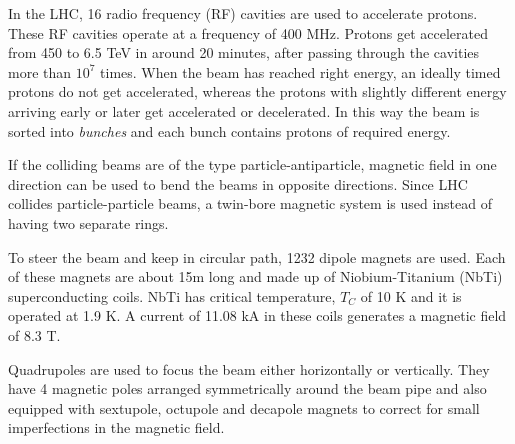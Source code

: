 In the LHC, 16 radio frequency (RF) cavities are used to accelerate protons. These RF cavities operate at a frequency of 400 MHz. Protons 
get accelerated from 450 \gev to 6.5 TeV in around 20 minutes, after passing through the cavities more than $10^7$ times. When the
beam has reached right energy, an ideally timed protons do not get accelerated, whereas the protons with slightly different energy
arriving early or later get accelerated or decelerated. In this way the beam is sorted into \textit{bunches} and each bunch contains
protons of required energy.

If the colliding beams are of the type particle-antiparticle, magnetic field in one direction can be used to bend the beams in opposite 
directions. Since LHC collides particle-particle beams, a twin-bore magnetic system is used instead of having two separate rings.

To steer the beam and keep in circular path, 1232 dipole magnets are used. Each of these magnets are about 15m long and made up of 
Niobium-Titanium (NbTi) superconducting coils. NbTi has critical temperature, $T_C$ of 10 K and it is operated at 1.9 K. A current of 
11.08 kA in these coils generates a magnetic field of 8.3 T.

Quadrupoles are used to focus the beam either horizontally or vertically. They have 4 magnetic poles arranged symmetrically around the 
beam pipe and also equipped with sextupole, octupole and decapole magnets to correct for small imperfections in the magnetic field.


